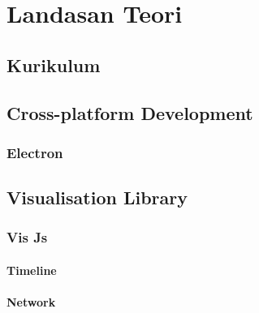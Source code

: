 \chapter{Landasan Teori}
\label{chap:teori}

\section{Kurikulum}

\section{Cross-platform Development}

\subsection{Electron}
 
\section{Visualisation Library}

\subsection{Vis Js}

\subsubsection{Timeline}

\subsubsection{Network}






